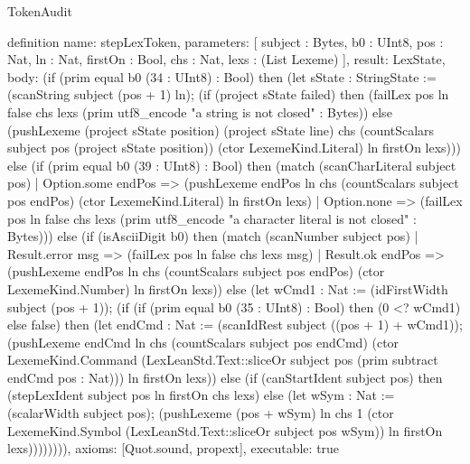 \begin{lexlean}{TokenAudit}
\begin{semanticmodule}
definition{
  name: stepLexToken,
  parameters: [
    subject : Bytes,
    b0 : UInt8,
    pos : Nat,
    ln : Nat,
    firstOn : Bool,
    chs : Nat,
    lexs : (List Lexeme)
  ],
  result: LexState,
  body: (if (prim equal b0 (34 : UInt8) : Bool) then (let sState : StringState := (scanString subject (pos + 1) ln); (if (project sState failed) then (failLex pos ln false chs lexs (prim utf8_encode "a string is not closed" : Bytes)) else (pushLexeme (project sState position) (project sState line) chs (countScalars subject pos (project sState position)) (ctor LexemeKind.Literal) ln firstOn lexs))) else (if (prim equal b0 (39 : UInt8) : Bool) then (match (scanCharLiteral subject pos)
    | Option.some endPos => (pushLexeme endPos ln chs (countScalars subject pos endPos) (ctor LexemeKind.Literal) ln firstOn lexs)
    | Option.none => (failLex pos ln false chs lexs (prim utf8_encode "a character literal is not closed" : Bytes))) else (if (isAsciiDigit b0) then (match (scanNumber subject pos)
    | Result.error msg => (failLex pos ln false chs lexs msg)
    | Result.ok endPos => (pushLexeme endPos ln chs (countScalars subject pos endPos) (ctor LexemeKind.Number) ln firstOn lexs)) else (let wCmd1 : Nat := (idFirstWidth subject (pos + 1)); (if (if (prim equal b0 (35 : UInt8) : Bool) then (0 <? wCmd1) else false) then (let endCmd : Nat := (scanIdRest subject ((pos + 1) + wCmd1)); (pushLexeme endCmd ln chs (countScalars subject pos endCmd) (ctor LexemeKind.Command (LexLeanStd.Text::sliceOr subject pos (prim subtract endCmd pos : Nat))) ln firstOn lexs)) else (if (canStartIdent subject pos) then (stepLexIdent subject pos ln firstOn chs lexs) else (let wSym : Nat := (scalarWidth subject pos); (pushLexeme (pos + wSym) ln chs 1 (ctor LexemeKind.Symbol (LexLeanStd.Text::sliceOr subject pos wSym)) ln firstOn lexs)))))))),
  axioms: [Quot.sound, propext],
  executable: true
}


\end{semanticmodule}
\end{lexlean}
